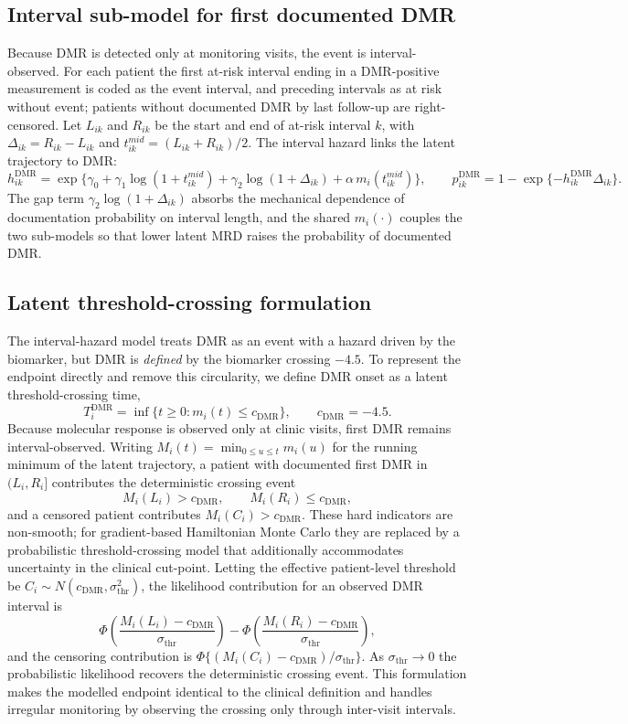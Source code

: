 \documentclass[11pt]{article}
\begin{document}
\subsection{Interval sub-model for first documented DMR}
\label{sec:interval}

Because DMR is detected only at monitoring visits, the event is
interval-observed. For each patient the first at-risk interval ending in a
DMR-positive measurement is coded as the event interval, and preceding
intervals as at risk without event; patients without documented DMR by
last follow-up are right-censored. Let $L_{ik}$ and $R_{ik}$ be the start
and end of at-risk interval $k$, with $\Delta_{ik}=R_{ik}-L_{ik}$ and
$t_{ik}^{mid}=(L_{ik}+R_{ik})/2$. The interval hazard links the latent
trajectory to DMR:
\[
h_{ik}^{\mathrm{DMR}}=
\exp\{\gamma_0+\gamma_1\log(1+t_{ik}^{mid})
+\gamma_2\log(1+\Delta_{ik})
+\alpha\, m_i(t_{ik}^{mid})\},
\qquad
p_{ik}^{\mathrm{DMR}}=
1-\exp\{-h_{ik}^{\mathrm{DMR}}\Delta_{ik}\}.
\]
The gap term $\gamma_2\log(1+\Delta_{ik})$ absorbs the mechanical
dependence of documentation probability on interval length, and the shared
$m_i(\cdot)$ couples the two sub-models so that lower latent MRD raises the
probability of documented DMR.

\subsection{Latent threshold-crossing formulation}
\label{sec:threshold}

The interval-hazard model treats DMR as an event with a hazard driven by
the biomarker, but DMR is \emph{defined} by the biomarker crossing $-4.5$.
To represent the endpoint directly and remove this circularity, we define
DMR onset as a latent threshold-crossing time,
\[
T_i^{\mathrm{DMR}}=\inf\{t\ge 0:m_i(t)\le c_{\mathrm{DMR}}\},
\qquad c_{\mathrm{DMR}}=-4.5.
\]
Because molecular response is observed only at clinic visits, first DMR
remains interval-observed. Writing $M_i(t)=\min_{0\le u\le t}m_i(u)$ for
the running minimum of the latent trajectory, a patient with documented
first DMR in $(L_i,R_i]$ contributes the deterministic crossing event
\[
M_i(L_i)>c_{\mathrm{DMR}}, \qquad M_i(R_i)\le c_{\mathrm{DMR}},
\]
and a censored patient contributes $M_i(C_i)>c_{\mathrm{DMR}}$. These hard
indicators are non-smooth; for gradient-based Hamiltonian Monte Carlo they
are replaced by a probabilistic threshold-crossing model that additionally
accommodates uncertainty in the clinical cut-point. Letting the effective
patient-level threshold be $C_i\sim N(c_{\mathrm{DMR}},\sigma_{\mathrm{thr}}^2)$,
the likelihood contribution for an observed DMR interval is
\[
\Phi\!\left(\frac{M_i(L_i)-c_{\mathrm{DMR}}}{\sigma_{\mathrm{thr}}}\right)
-
\Phi\!\left(\frac{M_i(R_i)-c_{\mathrm{DMR}}}{\sigma_{\mathrm{thr}}}\right),
\]
and the censoring contribution is
$\Phi\{(M_i(C_i)-c_{\mathrm{DMR}})/\sigma_{\mathrm{thr}}\}$. As
$\sigma_{\mathrm{thr}}\to 0$ the probabilistic likelihood recovers the
deterministic crossing event. This formulation makes the modelled endpoint
identical to the clinical definition and handles irregular monitoring by
observing the crossing only through inter-visit intervals.
\end{document}
